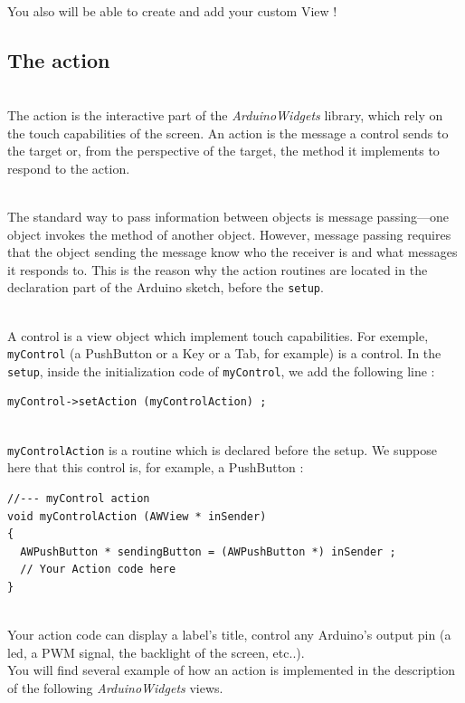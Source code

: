 \documentclass[a4paper,11pt]{extarticle}
\begin{document}
~\\ You also will be able to create and add your custom View !

\newpage
\subsection{The action}

~\\ The action is the interactive part of the \emph{ArduinoWidgets} library, which rely on the touch capabilities of the screen. An action is the message a control sends to the target or, from the perspective of the target, the method it implements to respond to the action. 

~\\The standard way to pass information between objects is message passing—one object invokes the method of another object. However, message passing requires that the object sending the message know who the receiver is and what messages it responds to. This is the reason why the action routines are located in the declaration part of the Arduino sketch, before the \texttt{setup}.

~\\ A control is a view object which implement touch capabilities. For exemple, \texttt{myControl} (a PushButton or a Key or a Tab, for example) is a control. In the \texttt{setup}, inside the initialization code of \texttt{myControl}, we add the following line :

\begin{lstlisting}[language=Arduinonl]
myControl->setAction (myControlAction) ;
\end{lstlisting}

~\\ \texttt{myControlAction} is a routine which is declared before the setup. We suppose here that this control is, for example, a PushButton :

\begin{lstlisting}[language=Arduinonl]
//--- myControl action
void myControlAction (AWView * inSender)
{
  AWPushButton * sendingButton = (AWPushButton *) inSender ;
  // Your Action code here
}
\end{lstlisting}

~\\ Your action code can display  a label's title, control any Arduino's output pin (a led, a PWM signal, the backlight of the screen, etc..).
~\\ You will find several example of how an action is implemented in the description of the following \emph{ArduinoWidgets} views.
\end{document}
